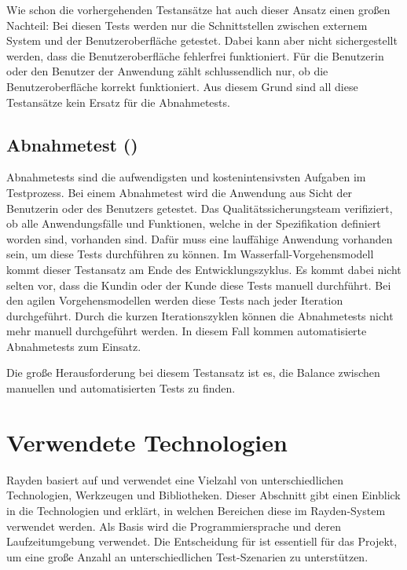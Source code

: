 \SuperPar
Wie schon die vorhergehenden Testansätze hat auch dieser Ansatz einen großen Nachteil: Bei diesen Tests werden nur die Schnittstellen zwischen externem System und der Benutzeroberfläche getestet. Dabei kann aber nicht sichergestellt werden, dass die Benutzeroberfläche fehlerfrei funktioniert. Für die Benutzerin oder den Benutzer der Anwendung zählt schlussendlich nur, ob die Benutzeroberfläche korrekt funktioniert. Aus diesem Grund sind all diese Testansätze kein Ersatz für die Abnahmetests.

\subsection{Abnahmetest ()}

Abnahmetests sind die aufwendigsten und kostenintensivsten Aufgaben im Testprozess. Bei einem Abnahmetest wird die Anwendung aus Sicht der Benutzerin oder des Benutzers getestet. Das Qualitätssicherungsteam verifiziert, ob alle Anwendungsfälle und Funktionen, welche in der Spezifikation definiert worden sind, vorhanden sind. Dafür muss eine lauffähige Anwendung vorhanden sein, um diese Tests durchführen zu können. Im Wasserfall-Vorgehensmodell kommt dieser Testansatz am Ende des Entwicklungszyklus. Es kommt dabei nicht selten vor, dass die Kundin oder der Kunde diese Tests manuell durchführt. Bei den agilen Vorgehensmodellen werden diese Tests nach jeder Iteration durchgeführt. Durch die kurzen Iterationszyklen können die Abnahmetests nicht mehr manuell durchgeführt werden. In diesem Fall kommen automatisierte Abnahmetests zum Einsatz. 

\SuperPar
Die große Herausforderung bei diesem Testansatz ist es, die Balance zwischen manuellen und automatisierten Tests zu finden.

\section{Verwendete Technologien}

Rayden basiert auf und verwendet eine Vielzahl von unterschiedlichen Technologien, Werkzeugen und Bibliotheken. Dieser Abschnitt gibt einen Einblick in die Technologien und erklärt, in welchen Bereichen diese im Rayden-System verwendet werden. Als Basis wird die Programmiersprache  und deren Laufzeitumgebung verwendet. Die Entscheidung für  ist essentiell für das Projekt, um eine große Anzahl an unterschiedlichen Test-Szenarien zu unterstützen. 

